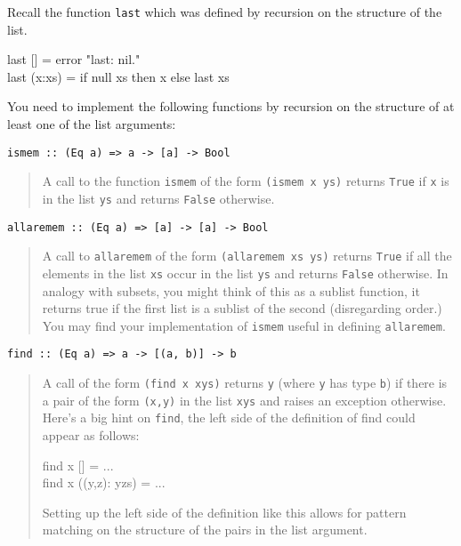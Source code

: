 \documentclass[11pt]{article}
\begin{document}

Recall the function {\tt{last}} which was defined by recursion on the structure of the list.

\begin{program*}
\> last [] = error "last: nil." \\
\> last (x:xs) = if null xs then x else last xs\\
\end{program*}

You need to implement the following functions by recursion on the structure of
at least one of the list arguments:

\begin{problem}
{\tt{ismem :: (Eq a) => a -> [a] -> Bool}} 
\begin{quotation}A call to the function {\tt{ismem}} of
the form {\tt{(ismem x ys)}} returns {\tt{True}} if {\tt{x}} is in the list
{\tt{ys}} and returns {\tt{False}} otherwise.
\end{quotation}
\end{problem}

\begin{problem}
{\tt{allaremem :: (Eq a) => [a] -> [a] -> Bool}}
\begin{quotation}
  A call to {\tt{allaremem}} of the form {\tt{(allaremem xs ys)}} returns
  {\tt{True}} if all the elements in the list {\tt{xs}} occur in the list
  {\tt{ys}} and returns {\tt{False}} otherwise. In analogy with subsets, you
  might think of this as a sublist function, it returns true if the first list
  is a sublist of the second (disregarding order.) You may find your
  implementation of {\tt{ismem}} useful in defining {\tt{allaremem}}.
\end{quotation}
\end{problem}

\begin{problem}
{\tt{find :: (Eq a) => a -> [(a, b)] -> b}}
\begin{quotation}
 A call of the form {\tt{(find x xys)}} returns {\tt{y}} (where {\tt{y}} has
  type {\tt{b}}) if there is a pair of the form {\tt{(x,y)}} in the list {\tt{xys}}
  and raises an exception otherwise.
Here's a big hint on {\tt{find}}, the left side of the definition of
find could appear as follows:

\begin{program*}
\> find x [] =  ... \\
\> find x ((y,z): yzs) = ...
\end{program*}
 Setting up the left side of the definition like this allows for pattern
matching on the structure of the pairs in the list argument.  
\end{quotation}
\end{problem}
\end{document}
